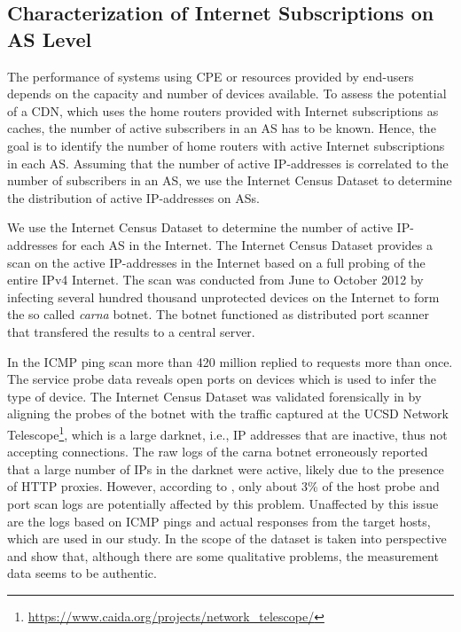 \subsection{Characterization of Internet Subscriptions on AS Level}\label{sec:aslevel:census}

The performance of systems using CPE or resources provided by end-users depends on the capacity and number of devices available.
To assess the potential of a CDN, which uses the home routers provided with Internet subscriptions as caches, the number of active subscribers in an AS has to be known.
Hence, the goal is to identify the number of home routers with active Internet subscriptions in each AS.
Assuming that the number of active IP-addresses is correlated to the number of subscribers in an AS, we use the Internet Census Dataset to determine the distribution of active IP-addresses on ASs.

We use the Internet Census Dataset \cite{carna2013} to determine the number of active IP-addresses for each AS in the Internet.
The Internet Census Dataset provides a scan on the active IP-addresses in the Internet based on a full probing of the entire IPv4 Internet.
The scan was conducted from June to October 2012 by infecting several hundred thousand unprotected devices on the Internet to form the so called \emph{carna} botnet.
The botnet functioned as distributed port scanner that transfered the results to a central server.

In the ICMP ping scan more than 420 million replied to requests more than once.
The service probe data reveals open ports on devices which is used to infer the type of device.
The Internet Census Dataset was validated forensically in \cite{dainotticaida} by aligning the probes of the botnet with the traffic captured at the UCSD Network Telescope\footnote{\url{https://www.caida.org/projects/network_telescope/}}, which is a large darknet, i.e., IP addresses that are inactive, thus not accepting connections.
The raw logs of the carna botnet erroneously reported that a large number of IPs in the darknet were active, likely due to the presence of HTTP proxies.
However, according to \cite{dainotticaida}, only about 3\% of the host probe and port scan logs are potentially affected by this problem.
Unaffected by this issue are the logs based on ICMP pings and actual responses from the target hosts, which are used in our study.
In \cite{krenc2014internet} the scope of the dataset is taken into perspective and show that, although there are some qualitative problems, the measurement data seems to be authentic.

